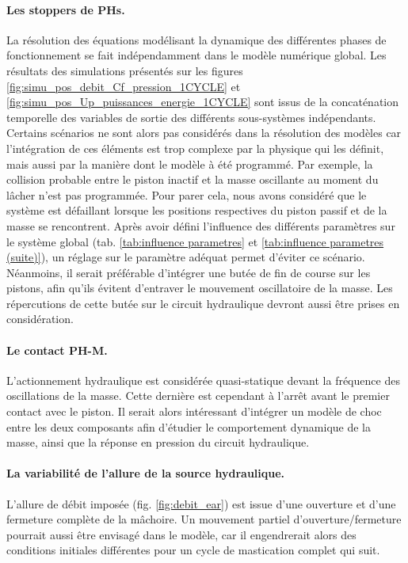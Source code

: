 \paragraph{Les stoppers de PHs.}
La résolution des équations modélisant la dynamique des différentes phases de fonctionnement se fait indépendamment dans le modèle numérique global. Les résultats des simulations présentés sur les figures \ref{fig:simu_pos_debit_Cf_pression_1CYCLE} et \ref{fig:simu_pos_Up_puissances_energie_1CYCLE} sont issus de la concaténation temporelle des variables de sortie des différents sous-systèmes indépendants. Certains scénarios ne sont alors pas considérés dans la résolution des modèles car l'intégration de ces éléments est trop complexe par la physique qui les définit, mais aussi par la manière dont le modèle à été programmé. Par exemple, la collision probable entre le piston inactif et la masse oscillante au moment du lâcher n'est pas programmée. Pour parer cela, nous avons considéré que le système est défaillant lorsque les positions respectives du piston passif et de la masse se rencontrent. Après avoir défini l'influence des différents paramètres sur le système global (tab. \ref{tab:influence parametres} et \ref{tab:influence parametres (suite)}), un réglage sur le paramètre adéquat permet d'éviter ce scénario. Néanmoins, il serait préférable d'intégrer une butée de fin de course sur les pistons, afin qu'ils évitent d'entraver le mouvement oscillatoire de la masse. Les répercutions de cette butée sur le circuit hydraulique devront aussi être prises en considération.

\paragraph*{Le contact PH-M.} L'actionnement hydraulique est considérée quasi-statique devant la fréquence des oscillations de la masse. Cette dernière est cependant à l'arrêt avant le premier contact avec le piston. Il serait alors intéressant d'intégrer un modèle de choc entre les deux composants afin d'étudier le comportement dynamique de la masse, ainsi que la réponse en pression du circuit hydraulique.

\paragraph{La variabilité de l'allure de la source hydraulique.}
L'allure de débit imposée (fig. \ref{fig:debit_ear}) est issue d'une ouverture et d'une fermeture complète de la mâchoire. Un mouvement partiel d'ouverture/fermeture pourrait aussi être envisagé dans le modèle, car il engendrerait alors des conditions initiales différentes pour un cycle de mastication complet qui suit. 
